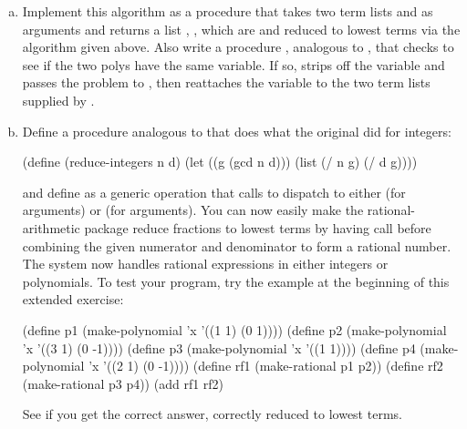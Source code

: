 \begin{exerciseGroup}
\label{Exercise 2.97}
\begin{enumerate}[a.]

\item
Implement this algorithm as a procedure  that takes two term
lists  and  as arguments and returns a list ,
, which are  and  reduced to lowest terms via the
algorithm given above.  Also write a procedure , analogous to
, that checks to see if the two polys have the same variable.
If so,  strips off the variable and passes the problem to
, then reattaches the variable to the two term lists
supplied by .

\item
Define a procedure analogous to  that does what the original
 did for integers:

\begin{codeBlock}
(define (reduce-integers n d)
  (let ((g (gcd n d)))
    (list (/ n g) (/ d g))))
\end{codeBlock}

\noindent
and define  as a generic operation that calls 
to dispatch to either  (for  arguments) or
 (for  arguments).  You can now
easily make the rational-arithmetic package reduce fractions to lowest terms by
having  call  before combining the given numerator
and denominator to form a rational number.  The system now handles rational
expressions in either integers or polynomials.  To test your program, try the
example at the beginning of this extended exercise:

\begin{codeBlock}
(define  p1 (make-polynomial 'x '((1 1) (0  1))))
(define  p2 (make-polynomial 'x '((3 1) (0 -1))))
(define  p3 (make-polynomial 'x '((1 1))))
(define  p4 (make-polynomial 'x '((2 1) (0 -1))))
(define rf1 (make-rational p1 p2))
(define rf2 (make-rational p3 p4))
(add rf1 rf2)
\end{codeBlock}

See if you get the correct answer, correctly reduced to lowest terms.
\end{enumerate}
\end{exerciseGroup}

